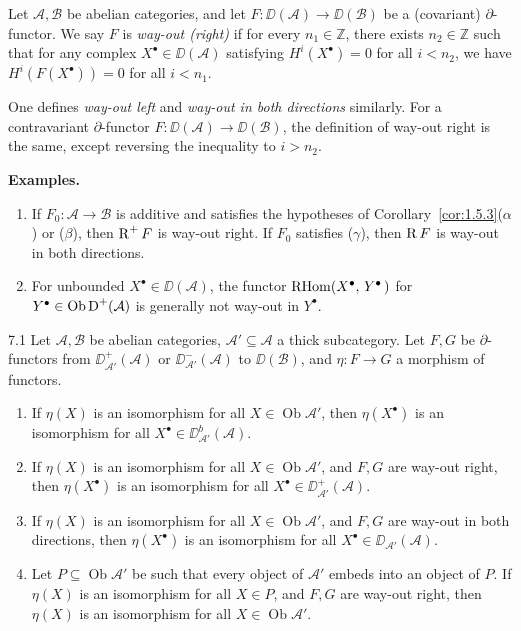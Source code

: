\begin{definition*}
Let $\mathcal{A},\mathcal{B}$ be abelian categories, and let $F\colon\DD(\mathcal{A})\to\DD(\mathcal{B})$ be a (covariant) $\partial$-functor.
We say $F$ is \emph{way-out (right)} if for every $n_1\in\mathbb{Z}$, there exists $n_2\in\mathbb{Z}$ such that
for any complex $X^\bullet\in\DD(\mathcal{A})$ satisfying $H^i(X^\bullet)=0$ for all $i<n_2$,
we have $H^i(F(X^\bullet))=0$ for all $i<n_1$.

One defines \emph{way-out left} and \emph{way-out in both directions} similarly.
For a contravariant $\partial$-functor $F\colon\DD(\mathcal{A})\to\DD(\mathcal{B})$,
the definition of way-out right is the same, except reversing the inequality to $i>n_2$.
\end{definition*}

\textbf{Examples.}
\begin{enumerate}
\item If $F_0\colon\mathcal{A}\to\mathcal{B}$ is additive and satisfies the hypotheses of Corollary~\ref{cor:1.5.3}($\alpha$) or ($\beta$),
then $\operatorname{R}^+F$ is way-out right.
If $F_0$ satisfies ($\gamma$), then $\operatorname{R} F$ is way-out in both directions.

\item For unbounded $X^\bullet\in\DD(\mathcal{A})$, the functor
$\operatorname{RHom}(X^\bullet,\,Y^\bullet\,)$ for  $Y^\bullet \in \operatorname{Ob} \operatorname{D}^+(\mathcal{A})$
is generally not way-out in $Y^\bullet$.
\end{enumerate}

\begin{bookproposition}{7.1}\label{prop:1.7.1}
Let $\mathcal{A},\mathcal{B}$ be abelian categories, $\mathcal{A}'\subseteq\mathcal{A}$ a thick subcategory.
Let $F,G$  be $\partial$-functors from $\DD_{\mathcal{A}'}^+(\mathcal{A})$ or $\DD_{\mathcal{A}'}^-(\mathcal{A})$ to $\DD(\mathcal{B})$,
and $\eta\colon F\to G$ a morphism of functors.
\begin{enumerate}
\item[(i)] If $\eta(X)$ is an isomorphism for all $X\in\operatorname{Ob}\mathcal{A}'$,
then $\eta(X^\bullet)$ is an isomorphism for all $X^\bullet\in\DD_{\mathcal{A}'}^b(\mathcal{A})$.

\item[(ii)] If $\eta(X)$ is an isomorphism for all $X\in\operatorname{Ob}\mathcal{A}'$,
and $F,G$ are way-out right,
then $\eta(X^\bullet)$ is an isomorphism for all $X^\bullet\in\DD_{\mathcal{A}'}^+(\mathcal{A})$.

\item[(iii)] If $\eta(X)$ is an isomorphism for all $X\in\operatorname{Ob}\mathcal{A}'$,
and $F,G$ are way-out in both directions,
then $\eta(X^\bullet)$ is an isomorphism for all $X^\bullet\in\DD_{\mathcal{A}'}(\mathcal{A})$.

\item[(iv)] Let $P\subseteq\operatorname{Ob}\mathcal{A}'$ be such that every object of $\mathcal{A}'$ embeds into an object of $P$.
If $\eta(X)$ is an isomorphism for all $X\in P$, and $F,G$ are way-out right,
then $\eta(X)$ is an isomorphism for all $X\in\operatorname{Ob}\mathcal{A}'$.
\end{enumerate}
\end{bookproposition}

